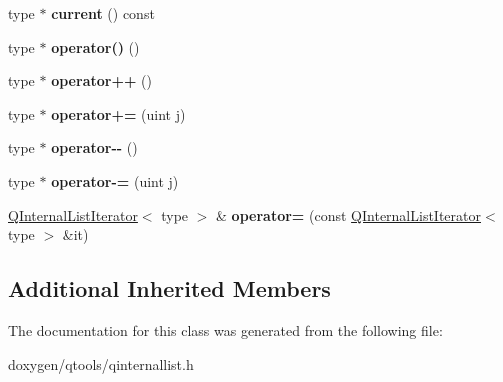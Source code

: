 \begin{DoxyCompactItemize}
type $\ast$ {\bfseries current} () const
\item 
\mbox{\label{class_q_internal_list_iterator_a3a8d473fc1f269bab890060f0263cac3}} 
type $\ast$ {\bfseries operator()} ()
\item 
\mbox{\label{class_q_internal_list_iterator_adcf215698697aff291a1475c94399749}} 
type $\ast$ {\bfseries operator++} ()
\item 
\mbox{\label{class_q_internal_list_iterator_a08a7b3c81dcf6d3ef4bfbb6a360a58bd}} 
type $\ast$ {\bfseries operator+=} (uint j)
\item 
\mbox{\label{class_q_internal_list_iterator_a833b6bef9e80b15dd9d514b53e5f30bc}} 
type $\ast$ {\bfseries operator-\/-\/} ()
\item 
\mbox{\label{class_q_internal_list_iterator_aebe9245e8273a9e7587d9b396d662fb3}} 
type $\ast$ {\bfseries operator-\/=} (uint j)
\item 
\mbox{\label{class_q_internal_list_iterator_a5a4f231d363bd81f726e70d43f9d71c3}} 
\mbox{\hyperlink{class_q_internal_list_iterator}{Q\+Internal\+List\+Iterator}}$<$ type $>$ \& {\bfseries operator=} (const \mbox{\hyperlink{class_q_internal_list_iterator}{Q\+Internal\+List\+Iterator}}$<$ type $>$ \&it)
\end{DoxyCompactItemize}
\subsection*{Additional Inherited Members}


The documentation for this class was generated from the following file\+:\begin{DoxyCompactItemize}
\item 
doxygen/qtools/qinternallist.\+h\end{DoxyCompactItemize}
